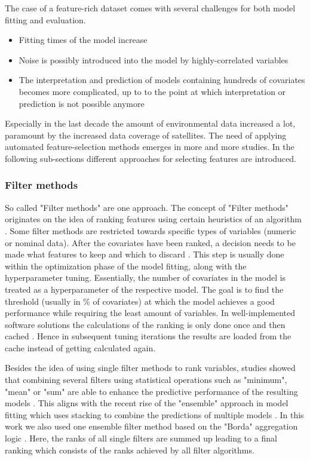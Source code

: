 \documentclass[review]{elsarticle}
\begin{document}
The case of a feature-rich dataset comes with several challenges for both model fitting and evaluation.

\begin{itemize}
	\item Fitting times of the model increase
	\item Noise is possibly introduced into the model by highly-correlated variables \citep{johnstoneiainm.2009}
	\item The interpretation and prediction of models containing hundreds of covariates becomes more complicated, up to to the point at which interpretation or prediction is not possible anymore \citep{johnstoneiainm.2009}
\end{itemize}

Especially in the last decade the amount of environmental data increased a lot, paramount by the increased data coverage of satellites.
The need of applying automated feature-selection methods emerges in more and more studies.
In the following sub-sections different approaches for selecting features are introduced.

\subsubsection{Filter methods}

So called "Filter methods" are one approach.
The concept of "Filter methods" originates on the idea of ranking features using certain heuristics of an algorithm \citep{chandrashekar2014}.
Some filter methods are restricted towards specific types of variables (numeric or nominal data).
After the covariates have been ranked, a decision needs to be made what features to keep and which to discard \citep{drotar2015}.
This step is usually done within the optimization phase of the model fitting, along with the hyperparameter tuning.
Essentially, the number of covariates in the model is treated as a hyperparameter of the respective model.
The goal is to find the threshold (usually in \% of covariates) at which the model achieves a good performance while requiring the least amount of variables.
In well-implemented software solutions the calculations of the ranking is only done once and then cached \citep{mlr}.
Hence in subsequent tuning iterations the results are loaded from the cache instead of getting calculated again.

Besides the idea of using single filter methods to rank variables, studies showed that combining several filters using statistical operations such as "minimum", "mean" or "sum" are able to enhance the predictive performance of the resulting models \citep{abeel2010, drotar2017a}.
This aligns with the recent rise of the "ensemble" approach in model fitting which uses stacking to combine the predictions of multiple models \citep{polikar2012, feurer2015}.
In this work we also used one ensemble filter method based on the "Borda" aggregation logic \citep{drotar2017a}.
Here, the ranks of all single filters are summed up leading to a final ranking which consists of the ranks achieved by all filter algorithms.
\end{document}
